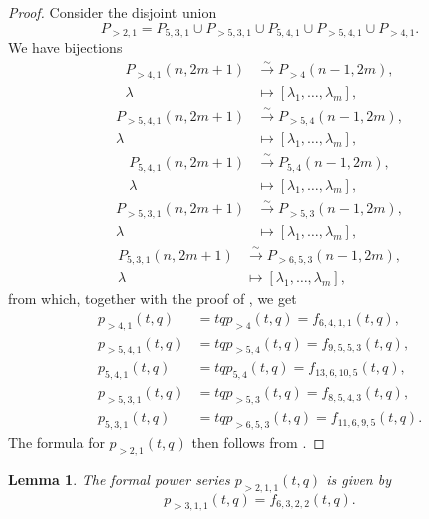 \documentclass[a4paper, 12pt, reqno]{amsart}
\newtheorem{lemma}[theorem]{Lemma}
\theoremstyle{remark}
\numberwithin{equation}{subsection}
\begin{document}
\begin{proof}
  Consider the disjoint union
  \begin{equation*}
    P_{>2, 1} = P_{5, 3, 1} \cup P_{>5, 3, 1} \cup P_{5, 4, 1} \cup P_{>5, 4, 1} \cup P_{>4, 1}.
  \end{equation*}
  We have bijections
  \begin{align*}
    P_{>4, 1}(n, 2m + 1) &\xrightarrow{\sim} P_{>4}(n - 1, 2m), \\
    \lambda &\mapsto [\lambda_1, \dots, \lambda_m],
  \end{align*}
  \begin{align*}
    P_{>5, 4, 1}(n, 2m + 1) &\xrightarrow{\sim} P_{>5, 4}(n - 1, 2m), \\
    \lambda &\mapsto [\lambda_1, \dots, \lambda_m],
  \end{align*}
  \begin{align*}
    P_{5, 4, 1}(n, 2m + 1) &\xrightarrow{\sim} P_{5, 4}(n - 1, 2m), \\
    \lambda &\mapsto [\lambda_1, \dots, \lambda_m],
  \end{align*}
  \begin{align*}
    P_{>5, 3, 1}(n, 2m + 1) &\xrightarrow{\sim} P_{>5, 3}(n - 1, 2m), \\
    \lambda &\mapsto [\lambda_1, \dots, \lambda_m],
  \end{align*}
  \begin{align*}
    P_{5, 3, 1}(n, 2m + 1) &\xrightarrow{\sim} P_{>6, 5, 3}(n - 1, 2m), \\
    \lambda &\mapsto [\lambda_1, \dots, \lambda_m],
  \end{align*}
  from which, together with the proof of , we get
  \begin{align*}
    p_{>4, 1}(t, q) &= tqp_{>4}(t, q) = f_{6, 4, 1, 1}(t, q), \\
    p_{>5, 4, 1}(t, q) &= tqp_{>5, 4}(t, q) = f_{9, 5, 5, 3}(t, q), \\
    p_{5, 4, 1}(t, q) &= tqp_{5, 4}(t, q) = f_{13, 6, 10, 5}(t, q), \\
    p_{>5, 3, 1}(t, q) &= tqp_{>5, 3}(t, q) = f_{8, 5, 4, 3}(t, q), \\
    p_{5, 3, 1}(t, q) &= tqp_{>6, 5, 3}(t, q) = f_{11, 6, 9, 5}(t, q).
  \end{align*}
  The formula for $p_{>2, 1}(t, q)$ then follows from .
\end{proof}

\begin{lemma}
  \label{lmm:28}
  The formal power series $p_{>2, 1, 1}(t, q)$ is given by
  \begin{equation*}
    p_{>3, 1, 1}(t, q) = f_{6, 3, 2, 2}(t, q).
  \end{equation*}
\end{lemma}
\end{document}
